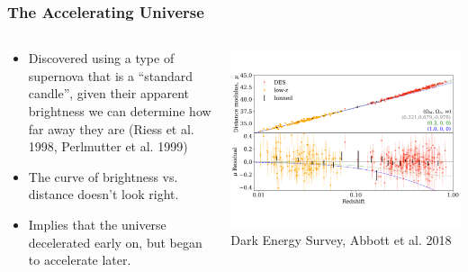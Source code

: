\documentclass{beamer}
\begin{document}
\frame
{
    \frametitle{The Accelerating Universe}

    \begin{columns}
        \begin{column}{0.5\textwidth}    
            \begin{itemize}

                \item Discovered using a type of supernova that is a ``standard
                    candle'', given their apparent brightness we can determine
                    how far away they are (Riess et al. 1998, Perlmutter et al. 1999)
                        
                \item The curve of brightness vs. distance doesn't look right.

                \item Implies that the universe decelerated early on,
                    but began to accelerate later.

            \end{itemize}
        \end{column}
        \begin{column}{0.5\textwidth}    
            \begin{center}
                \includegraphics[width=\textwidth]{hubble_diagram_combined.pdf}
                {\tiny Dark Energy Survey, Abbott et al. 2018}
            \end{center}
        \end{column}
    \end{columns}

}
\end{document}
